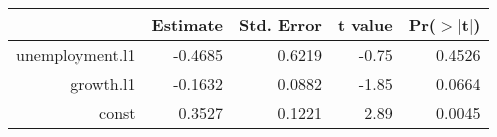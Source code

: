 \begin{table}[ht]
\centering
\begin{tabular}{rrrrr}
  \hline
 & Estimate & Std. Error & t value & Pr($>$$|$t$|$) \\ 
  \hline
unemployment.l1 & -0.4685 & 0.6219 & -0.75 & 0.4526 \\ 
  growth.l1 & -0.1632 & 0.0882 & -1.85 & 0.0664 \\ 
  const & 0.3527 & 0.1221 & 2.89 & 0.0045 \\ 
   \hline
\end{tabular}
\end{table}
